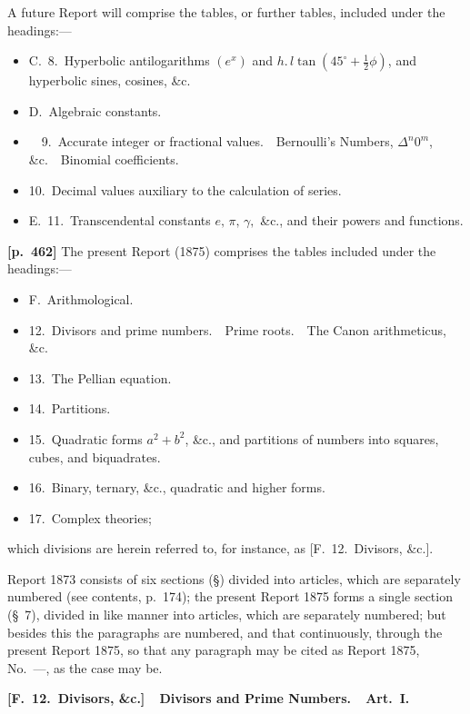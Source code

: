 \documentclass[11pt,a4paper]{article}
\begin{document}
A future Report will comprise the tables, or further tables, included under the headings:---
\begin{itemize}
\item[] C.~8.\ Hyperbolic antilogarithms $(e^x)$ and $h.\,l\tan(45^\circ+\tfrac{1}{2}\phi)$, and hyperbolic sines, cosines, \&c.
\item[] D.\ Algebraic constants.
\item[\phantom{D.}] \ \ 9.\ Accurate integer or fractional values.\ \ Bernoulli's Numbers, $\Delta^n 0^m$, \&c.\ \ Binomial coefficients.
\item[\phantom{D.}] 10.\ Decimal values auxiliary to the calculation of series.
\item[] E.\ 11.\ Transcendental constants $e,\,\pi,\,\gamma,$ \&c., and their powers and functions.
\end{itemize}

\bigskip
\noindent\textbf{[p.~462]}\quad
The present Report (1875) comprises the tables included under the headings:---
\begin{itemize}
\item[] F.\ Arithmological.
\item[\phantom{F.}] 12.\ Divisors and prime numbers.\ \ Prime roots.\ \ The Canon arithmeticus, \&c.
\item[\phantom{F.}] 13.\ The Pellian equation.
\item[\phantom{F.}] 14.\ Partitions.
\item[\phantom{F.}] 15.\ Quadratic forms $a^2+b^2$, \&c., and partitions of numbers into squares, cubes, and biquadrates.
\item[\phantom{F.}] 16.\ Binary, ternary, \&c., quadratic and higher forms.
\item[\phantom{F.}] 17.\ Complex theories;
\end{itemize}
which divisions are herein referred to, for instance, as [F.~12.\ Divisors, \&c.].

Report 1873 consists of six sections (\S) divided into articles, which are separately numbered (see contents, p.~174); the present Report 1875 forms a single section (\S~7), divided in like manner into articles, which are separately numbered; but besides this the paragraphs are numbered, and that continuously, through the present Report 1875, so that any paragraph may be cited as Report 1875, No.~---, as the case may be.

\bigskip
\begin{center}
\textbf{[F.~12.\ Divisors, \&c.]\ \ Divisors and Prime Numbers.\ \ Art.~I.}
\end{center}
\end{document}
